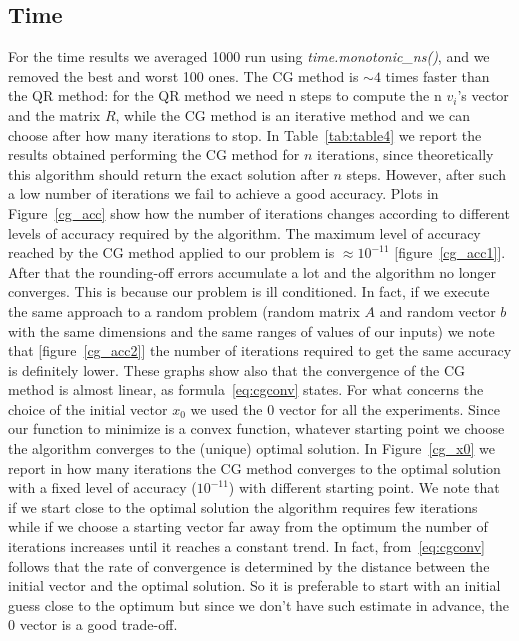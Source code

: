 \documentclass{article}
\begin{document}
\subsection{Time}\label{subsec:time}
For the time results we averaged 1000 run using \textit{time.monotonic\_ns()}, and we removed the best and worst 100 ones.
The CG method is $\sim 4$ times faster than the QR method: for the QR method we need n steps to compute the n $v_{i}$'s vector and the matrix $R$, while the CG method is an iterative method and we can choose after how many iterations to stop.
In Table~\ref{tab:table4} we report the results obtained performing the CG method for $n$ iterations, since theoretically this algorithm should return the exact solution after $n$ steps.
However, after such a low number of iterations we fail to achieve a good accuracy.
Plots in Figure~\ref{cg_acc} show how the number of iterations changes according to different levels of accuracy required by the algorithm.
The maximum level of accuracy reached by the CG method applied to our problem is $\approx 10^{-11}$ [figure~\ref{cg_acc1}].
After that the rounding-off errors accumulate a lot and the algorithm no longer converges.
This is because our problem is ill conditioned.
In fact, if we execute the same approach to a random problem (random matrix $A$ and random vector $b$ with the same dimensions and the same ranges of values of our inputs) we note that [figure~\ref{cg_acc2}] the number of iterations required to get the same accuracy is definitely lower.
These graphs show also that the convergence of the CG method is almost linear, as formula~\eqref{eq:cgconv} states.
For what concerns the choice of the initial vector $x_0$ we used the 0 vector for all the experiments.
Since our function to minimize is a convex function, whatever starting point we choose the algorithm converges to the (unique) optimal solution.
In Figure~\ref{cg_x0} we report in how many iterations the CG method converges to the optimal solution with a fixed level of accuracy ($10^{-11}$) with different starting point.
We note that if we start close to the optimal solution the algorithm requires few iterations while if we choose a starting vector far away from the optimum the number of iterations increases until it reaches a constant trend.
In fact, from~\eqref{eq:cgconv} follows that the rate of convergence is determined by the distance between the initial vector and the optimal solution.
So it is preferable to start with an initial guess close to the optimum but since we don't have such estimate in advance, the 0 vector is a good trade-off.
\end{document}
